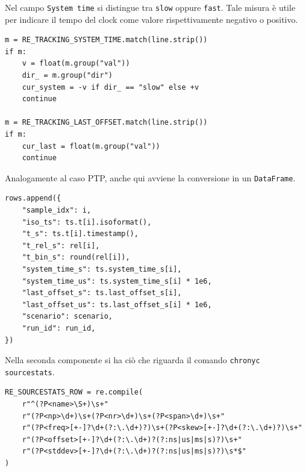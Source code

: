Nel campo \texttt{System time} si distingue tra \texttt{slow} oppure \texttt{fast}. Tale 
misura è utile per indicare il tempo del clock come valore rispettivamente 
negativo o positivo.

\begin{listing}[H]
\begin{verbatim}
m = RE_TRACKING_SYSTEM_TIME.match(line.strip())
if m:
    v = float(m.group("val"))
    dir_ = m.group("dir")
    cur_system = -v if dir_ == "slow" else +v
    continue

m = RE_TRACKING_LAST_OFFSET.match(line.strip())
if m:
    cur_last = float(m.group("val"))
    continue
\end{verbatim}
\caption{Attribuzione del segno al campo \texttt{System time}.}
\label{lst:chrony-system-time-sign}
\end{listing}

Analogamente al caso PTP, anche qui avviene la conversione in un \texttt{DataFrame}.

\begin{listing}[H]
\begin{verbatim}
rows.append({
    "sample_idx": i,
    "iso_ts": ts.t[i].isoformat(),
    "t_s": ts.t[i].timestamp(),
    "t_rel_s": rel[i],
    "t_bin_s": round(rel[i]),
    "system_time_s": ts.system_time_s[i],
    "system_time_us": ts.system_time_s[i] * 1e6,
    "last_offset_s": ts.last_offset_s[i],
    "last_offset_us": ts.last_offset_s[i] * 1e6,
    "scenario": scenario,
    "run_id": run_id,
})
\end{verbatim}
\caption{Costruzione del dataset Chrony per le metriche di tracking.}
\label{lst:chrony-build-tracking-df}
\end{listing}

Nella seconda componente si ha ciò che riguarda il comando \texttt{chronyc sourcestats}.

\begin{listing}[H]
\begin{verbatim}
RE_SOURCESTATS_ROW = re.compile(
    r"^(?P<name>\S+)\s+"
    r"(?P<np>\d+)\s+(?P<nr>\d+)\s+(?P<span>\d+)\s+"
    r"(?P<freq>[+-]?\d+(?:\.\d+)?)\s+(?P<skew>[+-]?\d+(?:\.\d+)?)\s+"
    r"(?P<offset>[+-]?\d+(?:\.\d+)?(?:ns|us|ms|s)?)\s+"
    r"(?P<stddev>[+-]?\d+(?:\.\d+)?(?:ns|us|ms|s)?)\s*$"
)
\end{verbatim}
\caption{Pattern utilizzato per estrarre le righe di \texttt{sourcestats}.}
\label{lst:chrony-regex-sourcestats}
\end{listing}


